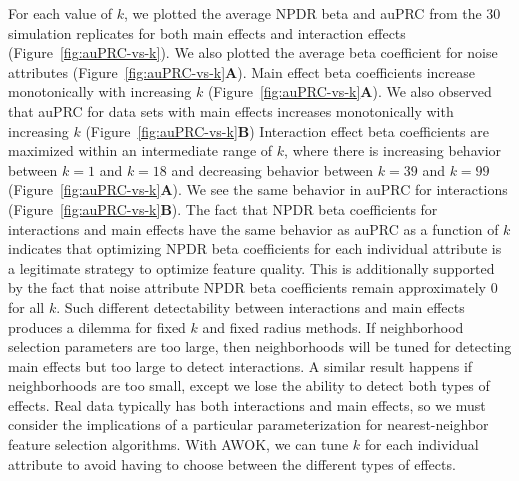 \documentclass[10pt,letterpaper]{article}
\begin{document}
For each value of $k$, we plotted the average NPDR beta and auPRC from the 30 simulation replicates for both main effects and interaction effects (Figure~\ref{fig:auPRC-vs-k}). We also plotted the average beta coefficient for noise attributes (Figure~\ref{fig:auPRC-vs-k}\textbf{A}). Main effect beta coefficients increase monotonically with increasing $k$ (Figure~\ref{fig:auPRC-vs-k}\textbf{A}). We also observed that auPRC for data sets with main effects increases monotonically with increasing $k$ (Figure~\ref{fig:auPRC-vs-k}\textbf{B}) Interaction effect beta coefficients are maximized within an intermediate range of $k$, where there is increasing behavior between $k=1$ and $k=18$ and decreasing behavior between $k=39$ and $k=99$ (Figure~\ref{fig:auPRC-vs-k}\textbf{A}). We see the same behavior in auPRC for interactions (Figure~\ref{fig:auPRC-vs-k}\textbf{B}). The fact that NPDR beta coefficients for interactions and main effects have the same behavior as auPRC as a function of $k$ indicates that optimizing NPDR beta coefficients for each individual attribute is a legitimate strategy to optimize feature quality. This is additionally supported by the fact that noise attribute NPDR beta coefficients remain approximately 0 for all $k$. Such different detectability between interactions and main effects produces a dilemma for fixed $k$ and fixed radius methods. If neighborhood selection parameters are too large, then neighborhoods will be tuned for detecting main effects but too large to detect interactions. A similar result happens if neighborhoods are too small, except we lose the ability to detect both types of effects. Real data typically has both interactions and main effects, so we must consider the implications of a particular parameterization for nearest-neighbor feature selection algorithms. With AWOK, we can tune $k$ for each individual attribute to avoid having to choose between the different types of effects.
\end{document}
